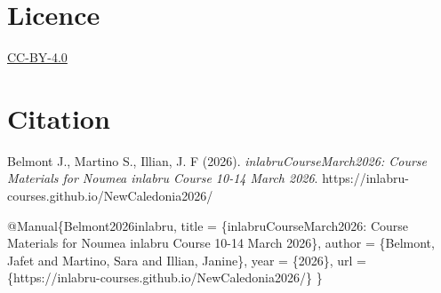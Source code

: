 \documentclass[
  letterpaper,
  DIV=11,
  numbers=noendperiod]{scrartcl}
\newenvironment{Shaded}{\begin{snugshade}}{\end{snugshade}}
\newcommand{\CommentTok}[1]{\textcolor[rgb]{0.37,0.37,0.37}{#1}}
\newcommand{\DataTypeTok}[1]{\textcolor[rgb]{0.68,0.00,0.00}{#1}}
\newcommand{\NormalTok}[1]{\textcolor[rgb]{0.00,0.23,0.31}{#1}}
\newcommand{\OtherTok}[1]{\textcolor[rgb]{0.00,0.23,0.31}{#1}}
\newcommand{\VariableTok}[1]{\textcolor[rgb]{0.07,0.07,0.07}{#1}}
\begin{document}
\section{Licence}\label{licence}

\href{https://creativecommons.org/licenses/by/4.0/}{CC-BY-4.0}

\section{Citation}\label{citation}

Belmont J., Martino S., Illian, J. F (2026).
\emph{inlabruCourseMarch2026: Course Materials for Noumea inlabru Course
10-14 March 2026}. https://inlabru-courses.github.io/NewCaledonia2026/

\begin{Shaded}
\begin{Highlighting}[]
\CommentTok{ }\VariableTok{@Manual}\NormalTok{\{}\OtherTok{Belmont2026inlabru}\NormalTok{,}
   \DataTypeTok{title}\NormalTok{ = \{inlabruCourseMarch2026: Course Materials for Noumea inlabru Course 10{-}14 March 2026\},}
   \DataTypeTok{author}\NormalTok{ = \{Belmont, Jafet and Martino, Sara and Illian, Janine\},}
   \DataTypeTok{year}\NormalTok{ = \{2026\},}
   \DataTypeTok{url}\NormalTok{ = \{https://inlabru{-}courses.github.io/NewCaledonia2026/\}}
\NormalTok{\}}
\end{Highlighting}
\end{Shaded}
\end{document}
